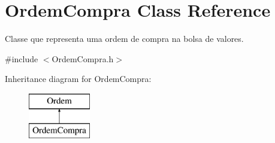 \hypertarget{class_ordem_compra}{}\section{Ordem\+Compra Class Reference}
\label{class_ordem_compra}


Classe que representa uma ordem de compra na bolsa de valores.  




{\ttfamily \#include $<$Ordem\+Compra.\+h$>$}

Inheritance diagram for Ordem\+Compra\+:\begin{figure}[H]
\begin{center}
\leavevmode
\includegraphics[height=2.000000cm]{class_ordem_compra}
\end{center}
\end{figure}
